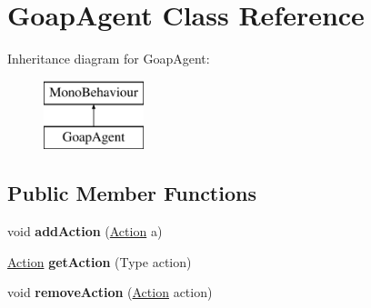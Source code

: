 \hypertarget{class_goap_agent}{}\section{Goap\+Agent Class Reference}
\label{class_goap_agent}
Inheritance diagram for Goap\+Agent\+:\begin{figure}[H]
\begin{center}
\leavevmode
\includegraphics[height=2.000000cm]{class_goap_agent}
\end{center}
\end{figure}
\subsection*{Public Member Functions}
\begin{DoxyCompactItemize}
\item 
\hypertarget{class_goap_agent_a7aa47d1e4c2635f9ad589d31b6277138}{}void {\bfseries add\+Action} (\hyperlink{class_action}{Action} a)\label{class_goap_agent_a7aa47d1e4c2635f9ad589d31b6277138}

\item 
\hypertarget{class_goap_agent_a60a08046c2b464d64638dfeca50ef122}{}\hyperlink{class_action}{Action} {\bfseries get\+Action} (Type action)\label{class_goap_agent_a60a08046c2b464d64638dfeca50ef122}

\item 
\hypertarget{class_goap_agent_a79216e289fd6fcf7625f2358585bbbd5}{}void {\bfseries remove\+Action} (\hyperlink{class_action}{Action} action)\label{class_goap_agent_a79216e289fd6fcf7625f2358585bbbd5}

\end{DoxyCompactItemize}
